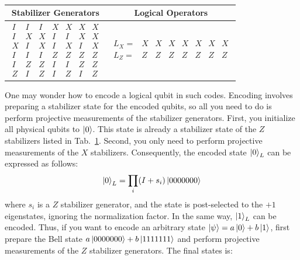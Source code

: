 \documentclass[a4paper,11pt]{ltjsarticle}
\begin{document}
{{{            \begin{table}[h]
                \centering
                \caption{ }
                \label{steane_code}
                \begin{tabular}{cc}
                    \hline
                    Stabilizer Generators & Logical Operators\\
                    \hline
                    {\setlength{\arraycolsep}{1pt}
                    $\begin{array}{ccccccc}
                        I&I&I&X&X&X&X\\
                        I&X&X&I&I&X&X\\
                        X&I&X&I&X&I&X\\
                        I&I&I&Z&Z&Z&Z\\
                        I&Z&Z&I&I&Z&Z\\
                        Z&I&Z&I&Z&I&Z
                    \end{array}$}&{\setlength{\arraycolsep}{1pt}
                    $\begin{array}{cccccccc}
                        L_X=&X&X&X&X&X&X&X\\
                        L_Z=&Z&Z&Z&Z&Z&Z&Z
                    \end{array}$}\\
                    \hline
                \end{tabular}
            \end{table}

            One may wonder how to encode a logical qubit in such codes. Encoding involves preparing a stabilizer state for the encoded qubits, so all you need to do is perform projective measurements of the stabilizer generators. First, you initialize all physical qubits to $\ket{0}$. This state is already a stabilizer state of the $Z$ stabilizers listed in Tab.~\ref{steane_code}. Second, you only need to perform projective measurements of the $X$ stabilizers. Consequently, the encoded state $\ket{0}_L$ can be expressed as follows:
            \begin{align*}
                \ket{0}_L=\prod_{i}(I+s_i)\ket{0000000}
            \end{align*}
            where $s_i$ is a $Z$ stabilizer generator, and the state is post-selected to the $+1$ eigenstates, ignoring the normalization factor. In the same way, $\ket{1}_L$ can be encoded. Thus, if you want to encode an arbitrary state $\ket{\psi} = a\ket{0} + b\ket{1}$, first prepare the Bell state $a\ket{0000000} + b\ket{1111111}$ and perform projective measurements of the $Z$ stabilizer generators. The final states is:

}}}
\end{document}
